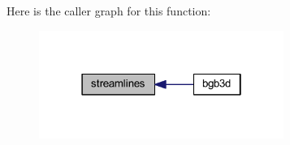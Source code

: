 Here is the caller graph for this function\+:
\nopagebreak
\begin{figure}[H]
\begin{center}
\leavevmode
\includegraphics[width=226pt]{func_nsubs_8f90_af36676ddada4a392f839d5884a3f0994_icgraph}
\end{center}
\end{figure}


\hypertarget{func_nsubs_8f90_ad23786e7bb8cf9c0b066f4bc0930a172}{}
